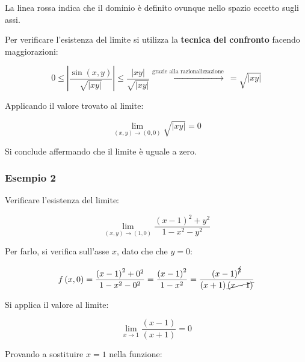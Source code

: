 \documentclass[a4paper]{article}
\begin{document}
	\noindent
	La linea rossa indica che il dominio è definito ovunque nello spazio eccetto sugli assi.\newline
	
	\noindent
	Per verificare l'esistenza del limite si utilizza la \textbf{tecnica del confronto} facendo maggiorazioni:
	
	\begin{equation*}
		0 \le \left|\dfrac{\sin\left(x,y\right)}{\sqrt{|xy|}}\right| \le \dfrac{|xy|}{\sqrt{|xy|}} \xrightarrow{\text{grazie alla razionalizzazione}} \: = \sqrt{|xy|}
	\end{equation*}

	\noindent
	Applicando il valore trovato al limite:
	
	\begin{equation*}
		\lim_{\left(x,y\right) \rightarrow \left(0,0\right)} \sqrt{|xy|} = 0
	\end{equation*}

	\noindent
	Si conclude affermando che il limite è uguale a zero.
	
	\newpage
	
	\subsubsection[Esempio 2]{\textcolor{Green4}{Esempio 2}}
	
	Verificare l'esistenza del limite:
	
	\begin{equation*}
		\lim_{\left(x,y\right) \rightarrow \left(1,0\right)} \dfrac{\left(x-1\right)^{2} + y^{2}}{1-x^{2}-y^{2}}
	\end{equation*}

	\noindent
	Per farlo, si verifica sull'asse $x$, dato che che $y = 0$:
	
	\begin{equation*}
		f\left(x,0\right) = \dfrac{\left(x-1\right)^{2} + 0^{2}}{1-x^{2}-0^{2}} = \dfrac{\left(x-1\right)^{2}}{1-x^{2}} = \dfrac{\left(x-1\right)^{\cancel{2}}}{\left(x+1\right)\cancel{\left(x-1\right)}}
	\end{equation*}

	\noindent
	Si applica il valore al limite:
	
	\begin{equation*}
		\lim_{x \rightarrow 1} \dfrac{\left(x-1\right)}{\left(x+1\right)} = 0
	\end{equation*}

	\noindent
	Provando a sostituire $x = 1$ nella funzione:
	
\end{document}
